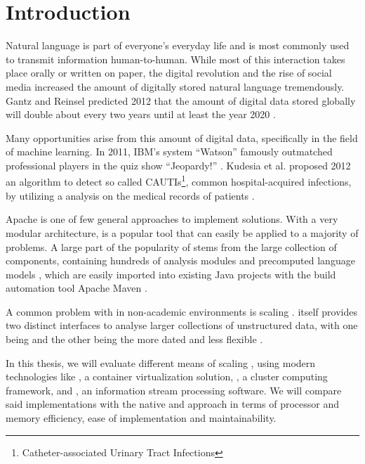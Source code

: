 \chapter{Introduction}

Natural language is part of everyone's everyday life and is most commonly used to transmit information human-to-human. While most of this interaction takes place orally or written on paper, the digital revolution and the rise of social media increased the amount of digitally stored natural language tremendously. Gantz and Reinsel predicted 2012 that the amount of digital data stored globally will double about every two years until at least the year 2020 \cite{gantz2012digital}.

Many opportunities arise from this amount of digital data, specifically in the field of machine learning. In 2011, IBM's \qa{} system ``Watson'' famously outmatched professional players in the quiz show ``Jeopardy!'' \cite{ferrucci2012introduction,epstein2012making}. Kudesia et al. proposed 2012 an algorithm to detect so called CAUTIs\footnote{Catheter-associated Urinary Tract Infections}, common hospital-acquired infections, by utilizing a \nlp{} analysis on the medical records of patients \cite{kudesia2012natural}.

Apache \uima{} is one of few general approaches to implement \nlp{} solutions. With a very modular architecture, \uima{} is a popular tool that can easily be applied to a majority of \nlp{} problems. A large part of the popularity of \uima{} stems from the large \dkpro{} collection of components, containing hundreds of analysis modules and precomputed language models \cite{eckartdecastilho-gurevych:2014:OIAF4HLT}, which are easily imported into existing Java projects with the build automation tool Apache Maven \cite{dkpro}.

A common problem with \uima{} in non-academic environments is scaling \cite{divita2015scaling,epstein2012making,ramakrishnan2010building}. \uima{} itself provides two distinct interfaces to analyse larger collections of unstructured data, with one being \uimaas{} and the other being the more dated and less flexible \cpe{} \cite{OASIS:UIMA:2009}.

In this thesis, we will evaluate different means of scaling \uima{}, using modern technologies like \docker{}, a container virtualization solution, \spark{}, a cluster computing framework, and \kafka{}, an information stream processing software. We will compare said implementations with the native \uimaas{} and \cpe{} approach in terms of processor and memory efficiency, ease of implementation and maintainability.


